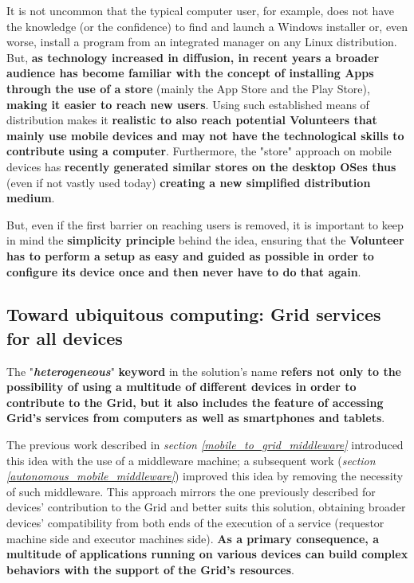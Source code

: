 It is not uncommon that the typical computer user, for example, does not have the knowledge (or the confidence) to find and launch a Windows installer or, even worse, install a program from an integrated manager on any Linux distribution. But, \textbf{as technology increased in diffusion, in recent years a broader audience has become familiar with the concept of installing Apps through the use of a store} (mainly the App Store and the Play Store), \textbf{making it easier to reach new users}. Using such established means of distribution makes it \textbf{realistic to also reach potential Volunteers that mainly use mobile devices and may not have the technological skills to contribute using a computer}. Furthermore, the "store" approach on mobile devices has \textbf{recently generated similar stores on the desktop OSes thus} (even if not vastly used today) \textbf{creating a new simplified distribution medium}.

But, even if the first barrier on reaching users is removed, it is important to keep in mind the \textbf{simplicity principle} behind the idea, ensuring that the \textbf{Volunteer has to perform a setup as easy and guided as possible in order to configure its device once and then never have to do that again}.

\subsection{Toward ubiquitous computing: Grid services for all devices}\label{grid_services_for_all_devices}
The "\textbf{\textit{heterogeneous}}" \textbf{keyword} in the solution's name \textbf{refers not only to the possibility of using a multitude of different devices in order to contribute to the Grid, but it also includes the feature of accessing Grid's services from computers as well as smartphones and tablets}.

The previous work described in \textit{section \ref{mobile_to_grid_middleware}} introduced this idea with the use of a middleware machine; a subsequent work (\textit{section \ref{autonomous_mobile_middleware}}) improved this idea by removing the necessity of such middleware. This approach mirrors the one previously described for devices' contribution to the Grid and better suits this solution, obtaining broader devices' compatibility from both ends of the execution of a service (requestor machine side and executor machines side). \textbf{As a primary consequence, a multitude of applications running on various devices can build complex behaviors with the support of the Grid's resources}.

